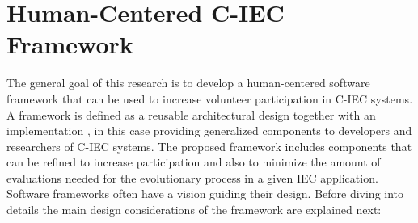 \section{Human-Centered C-IEC Framework}
\label{sec:framework}
The general goal of this research is to develop a human-centered \cite{gasson2003human} 
software framework that can be used to increase volunteer participation 
in C-IEC systems. A framework is defined as a reusable architectural design together
with an implementation \cite{campbell1991choices}, in this case 
providing generalized components to developers and researchers of C-IEC systems. 
The proposed framework includes components that can be refined to increase
participation and also to minimize the amount of evaluations needed for the evolutionary 
process in a given IEC application. Software frameworks often have 
a vision \cite{carneiro2010introducing} guiding their
design. Before diving into details the main design considerations of the
framework are explained next: 

